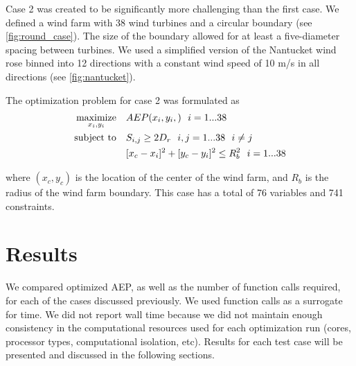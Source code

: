 \documentclass[a4paper]{jpconf}
\begin{document}
  Case 2 was created to be significantly more challenging than the first case. We defined a wind farm with 38 wind turbines and a circular boundary (see \cref{fig:round_case}). The size of the boundary allowed for at least a five-diameter spacing between turbines. We used a simplified version of the Nantucket wind rose binned into 12 directions with a constant wind speed of 10 m/s in all directions (see \cref{fig:nantucket}).


The optimization problem for case 2 was formulated as
%
\begin{equation}
	\label{e:objective}
	\begin{aligned} [b]
	\underset{x_i,y_i}{\textrm{maximize}} \quad & AEP(x_i,y_i,)~~i=1...38\\
	\textrm{subject to} \quad & S_{i,j} \geq 2\*D_{r}~~i,j=1...38~~i \neq j\\
	 & [x_c-x_i]^2+[y_c-y_i]^2 \leq R_{b}^2~~i=1...38\\
	\end{aligned}
\end{equation}
%
where $(x_c,y_c)$ is the location of the center of the wind farm, and $R_b$ is the radius of the wind farm boundary. This case has a total of 76 variables and 741 constraints.

\section{Results}\label{sec:results}
We compared optimized AEP, as well as the number of function calls required, for each of the cases discussed previously. We used function calls as a surrogate for time. We did not report wall time because we did not maintain enough consistency in the computational resources used for each optimization run (cores, processor types, computational isolation, etc). Results for each test case will be presented and discussed in the following sections.

\end{document}
